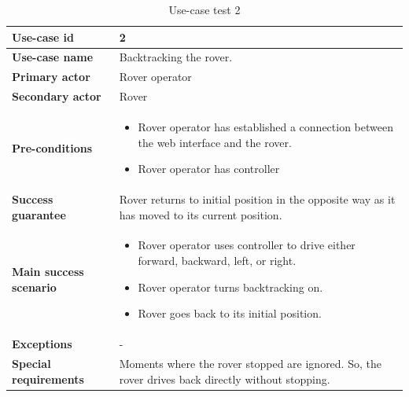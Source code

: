 \documentclass[12pt]{article}
\begin{document}
	\begin{table}[H]
		\centering
		\begin{tabularx}{\linewidth}{|X|X|}
			\hline
			\textbf{Use-case id} &2\\
			\hline
			\textbf{Use-case name} &Backtracking the rover.\\
			\hline
			\textbf{Primary actor} &Rover operator\\
			\hline
			\textbf{Secondary actor} &Rover\\
			\hline
			\textbf{Pre-conditions} &\begin{itemize}
				\item Rover operator has established a connection between the web interface and the rover.
				\item Rover operator has controller
			\end{itemize}\\
			\hline
			\textbf{Success guarantee} &Rover returns to initial position in the opposite way as it has moved to its current position.\\
			\hline
			\textbf{Main success scenario} &\begin{itemize}
				\item Rover operator uses controller to drive either forward, backward, left, or right.
				\item Rover operator turns backtracking on.
				\item Rover goes back to its initial position.
			\end{itemize}\\
			\hline
			\textbf{Exceptions} &-\\
			\hline
			\textbf{Special requirements} &Moments where the rover stopped are ignored. So, the rover drives back directly without stopping.\\
			\hline
		\end{tabularx}
		\caption{Use-case test 2}
		\label{table:Use-case test 2}   
	\end{table}
\end{document}
